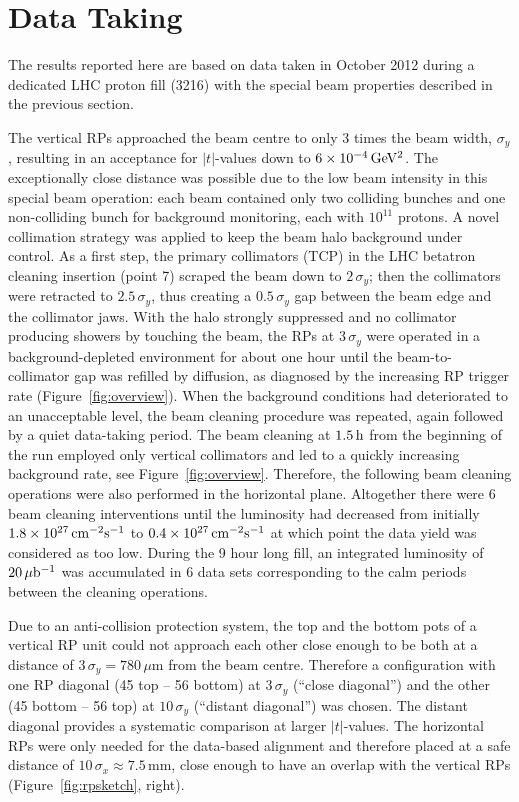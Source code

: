 \section{Data Taking}
\label{sec:data taking}

\iffalse
The results reported here are based on data taken in October 2012 
during a dedicated LHC proton fill (3216)
with the special beam properties described in the previous section.

The vertical RPs approached the beam centre to only 3 times the beam width, $\sigma_{y}$, resulting in an acceptance for $|t|$-values down to $6 \times 10^{-4}\,\rm GeV^{2}$. The exceptionally close distance was possible due to the low beam intensity in this special beam operation: each beam contained only two colliding bunches and one non-colliding bunch for background monitoring, each with $10^{11}$ protons. A novel collimation strategy was applied to keep the beam halo background under control. As a first step, the primary 
collimators (TCP) in the LHC betatron cleaning insertion (point 7) scraped the beam down to $2\,\sigma_{y}$; then the collimators were retracted to $2.5\,\sigma_{y}$, thus creating a $0.5\,\sigma_{y}$ gap between
the beam edge and the collimator jaws. With the halo strongly suppressed 
and no collimator producing showers by touching the beam, the RPs at 
$3\,\sigma_{y}$ were operated in a background-depleted environment for about one 
hour until the beam-to-collimator gap was refilled by diffusion, as 
diagnosed by the increasing RP trigger rate (Figure~\ref{fig:overview}). When the background conditions
had deteriorated to an unacceptable level, the beam cleaning procedure was repeated, again followed by a quiet data-taking period. The beam cleaning at $1.5\,{\rm h}$ from the beginning of the run employed only vertical collimators and led to a quickly increasing background rate, see Figure~\ref{fig:overview}. Therefore, the following beam cleaning operations were also performed in the horizontal plane. Altogether there were 6 beam cleaning interventions until the luminosity had decreased from initially $1.8\times10^{27}\,\rm cm^{-2}s^{-1}$ to 
$0.4\times10^{27}\,\rm cm^{-2}s^{-1}$
at which point the data yield was considered as too low. 
During the 9 hour long fill, an integrated luminosity of $20\,\rm \mu b^{-1}$ 
was accumulated in 6 data sets corresponding to the calm periods 
between the cleaning operations. 

Due to an anti-collision protection system, the top and the bottom pots of a 
vertical RP unit could not approach each other close enough to be both at a 
distance of $3\,\sigma_{y} = 780\,\mu$m from the beam centre. Therefore a 
configuration with one RP diagonal (45 top -- 56 bottom) at $3\,\sigma_{y}$ (``close diagonal'') and the other (45 bottom -- 56 top) at 
$10\,\sigma_{y}$ (``distant diagonal'') was chosen. The distant diagonal provides a systematic comparison at larger $|t|$-values.
The horizontal RPs were only needed for the data-based alignment and therefore placed at a safe distance of $10\,\sigma_{x} \approx 7.5$\,mm, close enough to have an overlap with the vertical RPs (Figure~\ref{fig:rpsketch}, right).

